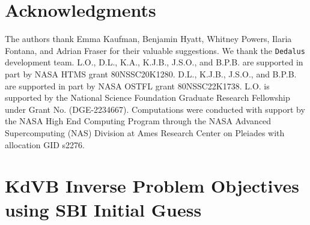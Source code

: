\documentclass[%
 reprint,
 amsmath,amssymb,
 aps,
 pre,
]{revtex4-2}
\begin{document}


\section*{Acknowledgments}
The authors thank Emma Kaufman, Benjamin Hyatt, Whitney Powers, Ilaria Fontana, and Adrian Fraser for their valuable suggestions.
We thank the \texttt{Dedalus} development team. 
L.O., D.L., K.A., K.J.B., J.S.O., and B.P.B. are supported in part by NASA HTMS grant 80NSSC20K1280. D.L., K.J.B., J.S.O., and B.P.B. are supported in part by NASA OSTFL grant 80NSSC22K1738. 
L.O. is supported by the National Science Foundation Graduate Research Fellowship under Grant No. (DGE-2234667).
Computations were conducted with support by the NASA High End Computing Program through the NASA Advanced Supercomputing (NAS) Division at Ames Research Center on Pleiades with allocation GID s2276.


\appendix\label{secAppendix}
% 
\section{KdVB Inverse Problem Objectives using SBI Initial Guess}\label{secAppKdVBSBI}
\end{document}
